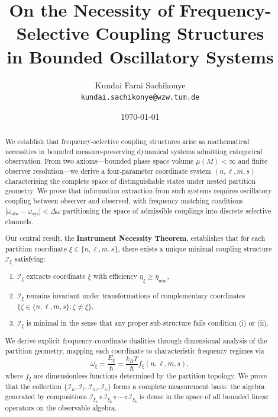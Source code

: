 \documentclass[twocolumn,10pt,a4paper]{article}
\title{\textbf{On the Necessity of Frequency-Selective Coupling Structures\\in Bounded Oscillatory Systems}}
\author{
Kundai Farai Sachikonye\\
\texttt{kundai.sachikonye@wzw.tum.de}
}
\date{\today}
\theoremstyle{remark}
\begin{document}
\maketitle

\begin{abstract}

We establish that frequency-selective coupling structures arise as mathematical necessities in bounded measure-preserving dynamical systems admitting categorical observation. From two axioms—bounded phase space volume $\mu(M) < \infty$ and finite observer resolution—we derive a four-parameter coordinate system $(n, \ell, m, s)$ characterising the complete space of distinguishable states under nested partition geometry. We prove that information extraction from such systems requires oscillatory coupling between observer and observed, with frequency matching conditions $|\omega_{\text{obs}} - \omega_{\text{sys}}| < \Delta\omega$ partitioning the space of admissible couplings into discrete selective channels.

Our central result, the \textbf{Instrument Necessity Theorem}, establishes that for each partition coordinate $\xi \in \{n, \ell, m, s\}$, there exists a unique minimal coupling structure $\mathcal{I}_\xi$ satisfying:
\begin{enumerate}[label=(\roman*)]
    \item $\mathcal{I}_\xi$ extracts coordinate $\xi$ with efficiency $\eta_\xi \geq \eta_{\min}$,
    \item $\mathcal{I}_\xi$ remains invariant under transformations of complementary coordinates $\{\zeta \in \{n,\ell,m,s\} : \zeta \neq \xi\}$,
    \item $\mathcal{I}_\xi$ is minimal in the sense that any proper sub-structure fails condition (i) or (ii).
\end{enumerate}
We derive explicit frequency-coordinate dualities through dimensional analysis of the partition geometry, mapping each coordinate to characteristic frequency regimes via
\begin{equation}
\omega_\xi = \frac{E_\xi}{\hbar} = \frac{k_B T}{\hbar} f_\xi(n, \ell, m, s),
\end{equation}
where $f_\xi$ are dimensionless functions determined by the partition topology. We prove that the collection $\{\mathcal{I}_n, \mathcal{I}_\ell, \mathcal{I}_m, \mathcal{I}_s\}$ forms a complete measurement basis: the algebra generated by compositions $\mathcal{I}_{\xi_1} \circ \mathcal{I}_{\xi_2} \circ \cdots \circ \mathcal{I}_{\xi_k}$ is dense in the space of all bounded linear operators on the observable algebra.


\end{abstract}
\end{document}
